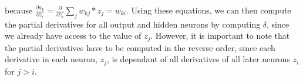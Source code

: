 \documentclass[11pt]{article}
\begin{document}
because $\frac{\partial a_k}{\partial z_i} = \frac{\partial}{\partial z_i} \sum_{j} w_{kj} * z_j = w_{ki}$.
Using these equations, we can then compute the partial derivatives for all output and hidden neurons
by computing $\delta$, since we already have access to the value of $z_j$.
However, it is important to note that the partial derivatives have to be computed in the reverse order,
since each derivative in each neuron, $z_j$, is dependant of all derivatives of all later neurons $z_i$ for $j > i$.
\end{document}
